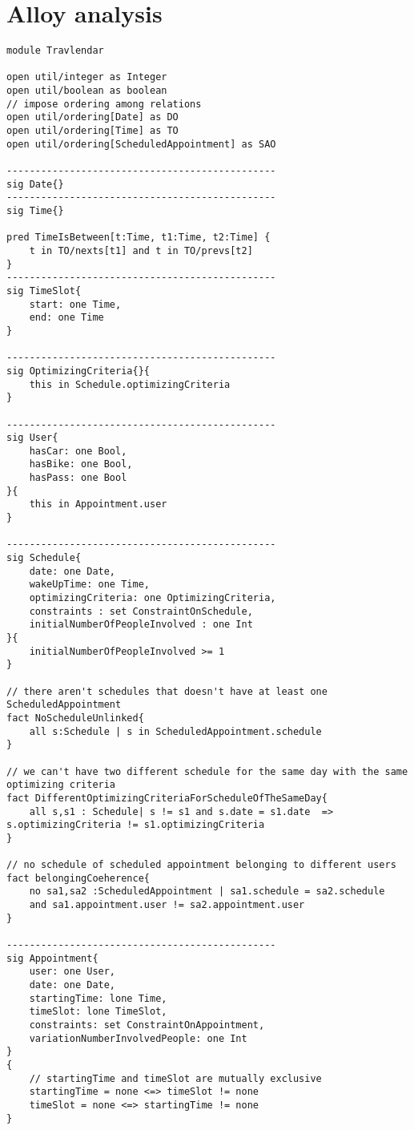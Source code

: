 \chapter{Alloy analysis}

\begin{lstlisting}
module Travlendar

open util/integer as Integer
open util/boolean as boolean
// impose ordering among relations
open util/ordering[Date] as DO 
open util/ordering[Time] as TO
open util/ordering[ScheduledAppointment] as SAO

-----------------------------------------------
sig Date{}
-----------------------------------------------
sig Time{}

pred TimeIsBetween[t:Time, t1:Time, t2:Time] {
	t in TO/nexts[t1] and t in TO/prevs[t2]
}
-----------------------------------------------
sig TimeSlot{
	start: one Time,
	end: one Time
}

-----------------------------------------------
sig OptimizingCriteria{}{
	this in Schedule.optimizingCriteria
}

-----------------------------------------------
sig User{
	hasCar: one Bool,
	hasBike: one Bool,
	hasPass: one Bool
}{
	this in Appointment.user
}

-----------------------------------------------
sig Schedule{
	date: one Date,
	wakeUpTime: one Time,
	optimizingCriteria: one OptimizingCriteria,
	constraints : set ConstraintOnSchedule,
	initialNumberOfPeopleInvolved : one Int
}{
	initialNumberOfPeopleInvolved >= 1
}

// there aren't schedules that doesn't have at least one ScheduledAppointment
fact NoScheduleUnlinked{
	all s:Schedule | s in ScheduledAppointment.schedule  
}

// we can't have two different schedule for the same day with the same optimizing criteria
fact DifferentOptimizingCriteriaForScheduleOfTheSameDay{
	all s,s1 : Schedule| s != s1 and s.date = s1.date  => s.optimizingCriteria != s1.optimizingCriteria 
}

// no schedule of scheduled appointment belonging to different users
fact belongingCoeherence{
	no sa1,sa2 :ScheduledAppointment | sa1.schedule = sa2.schedule 
	and sa1.appointment.user != sa2.appointment.user
}

-----------------------------------------------
sig Appointment{
	user: one User,
	date: one Date,
	startingTime: lone Time,
	timeSlot: lone TimeSlot,
	constraints: set ConstraintOnAppointment,
	variationNumberInvolvedPeople: one Int
}
{	
	// startingTime and timeSlot are mutually exclusive
	startingTime = none <=> timeSlot != none
	timeSlot = none <=> startingTime != none
}


\end{lstlisting}
